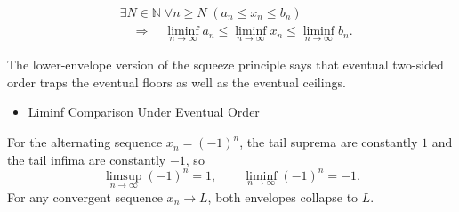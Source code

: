 \begin{remark*}
\[
\begin{aligned}
&\exists N\in\mathbb{N}\;\forall n\ge N\;(a_n\le x_n\le b_n)\\
&\quad\Longrightarrow\quad
\liminf_{n\to\infty}a_n
\le
\liminf_{n\to\infty}x_n
\le
\liminf_{n\to\infty}b_n.
\end{aligned}
\]
\end{remark*}

\begin{remark*}[Interpretation]
The lower-envelope version of the squeeze principle says that eventual
two-sided order traps the eventual floors as well as the eventual ceilings.
\end{remark*}

\begin{remark*}[Dependencies]\hfill
\begin{itemize}
  \item \hyperref[thm:liminf-comparison-under-eventual-order]{Liminf Comparison Under Eventual Order}
\end{itemize}
\end{remark*}

\begin{remark*}
For the alternating sequence $x_n=(-1)^n$, the tail suprema are constantly
$1$ and the tail infima are constantly $-1$, so
\[
  \limsup_{n\to\infty}(-1)^n=1,
  \qquad
  \liminf_{n\to\infty}(-1)^n=-1.
\]
For any convergent sequence $x_n\to L$, both envelopes collapse to $L$.
\end{remark*}